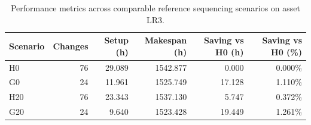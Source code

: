 \begin{table}[!htbp]
\centering
\caption{Performance metrics across comparable reference sequencing scenarios on asset LR3.}
\label{tab:reference_scenarios}
\renewcommand{\arraystretch}{1.15}
\small
\begin{tabularx}{\textwidth}{Xrrrrr}
\toprule
\textbf{Scenario} & \textbf{Changes} & \textbf{Setup (h)} & \textbf{Makespan (h)} & \textbf{Saving vs H0 (h)} & \textbf{Saving vs H0 (\%)} \\
\midrule
H0 & 76 & 29.089 & 1542.877 & 0.000 & 0.000\% \\
G0 & 24 & 11.961 & 1525.749 & 17.128 & 1.110\% \\
H20 & 76 & 23.343 & 1537.130 & 5.747 & 0.372\% \\
G20 & 24 & 9.640 & 1523.428 & 19.449 & 1.261\% \\
\bottomrule
\end{tabularx}
\end{table}
